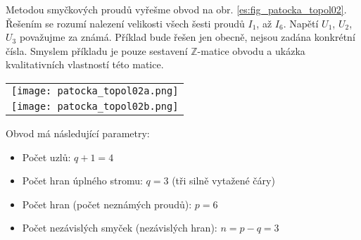 \begin{example}\label{TEO:exam015}
  Metodou smyčkových proudů vyřešme obvod na obr. \ref{es:fig_patocka_topol02}. Řešením se rozumí 
  nalezení velikosti všech šesti proudů \(I_1\), až \(I_6\). Napětí \(U_1\), \(U_2\), \(U_3\) 
  považujme za známá. Příklad bude řešen jen obecně, nejsou zadána konkrétní čísla. Smyslem 
  příkladu je pouze sestavení \(\mathbb{Z}\)-matice obvodu a ukázka kvalitativních vlastností této 
  matice.
  
   {\centering  
    \begin{tabular}{c}
        \texttt{[image: patocka\_topol02a.png]}  \\
        \texttt{[image: patocka\_topol02b.png]}
    \end{tabular}
    \captionsetup{type=figure}
    \label{es:fig_patocka_topol02}
  \par}
  
  Obvod má následující parametry:
  \begin{itemize}\addtolength{\itemsep}{-0.2\baselineskip}
   \item Počet uzlů: \(q + 1 = 4\)
   \item Počet hran úplného stromu: \(q = 3\) (tři silně vytažené čáry)
   \item Počet hran (počet neznámých proudů): \(p = 6\)
   \item Počet nezávislých smyček (nezávislých hran): \(n=p-q=3\)
  \end{itemize}
  

\end{example}
